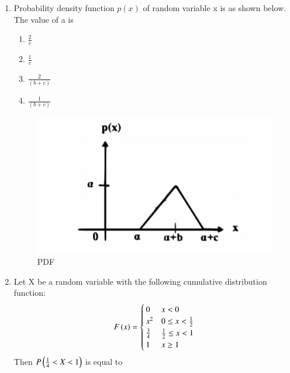 \begin{enumerate}[label=\thesection.\arabic*.,ref=\thesection.\theenumi]
\item Probability density function $p(x)$ of random variable x is as shown below. The value of a is
\begin{enumerate}[label=\Alph*)]
    \item $\frac{2}{c}$
    \item $\frac{1}{c}$
    \item $\frac{2}{(b+c)}$
    \item $\frac{1}{(b+c)}$
\end{enumerate}
\begin{figure}[!ht]
\centering
\includegraphics[width=\columnwidth]{solutions/in/2006/2/figures/convolution.png}
\caption{PDF}
\label{in2006-2:fig:convolution}
\end{figure}
%
\solution


\item Let X be a random variable with the following cumulative distribution function:
\begin{align}
F\left(x\right) 
= 
\begin{cases}
0           & x < 0 \\
x^2         & 0 \leq x < \frac{1}{2} \\
\frac{3}{4} & \frac{1}{2} \leq x < 1 \\
1           &  x \geq 1 
\end{cases}
\end{align}
Then $ P\left(\frac{1}{4} < X < 1\right)$ is equal to

%
\solution



\end{enumerate}
